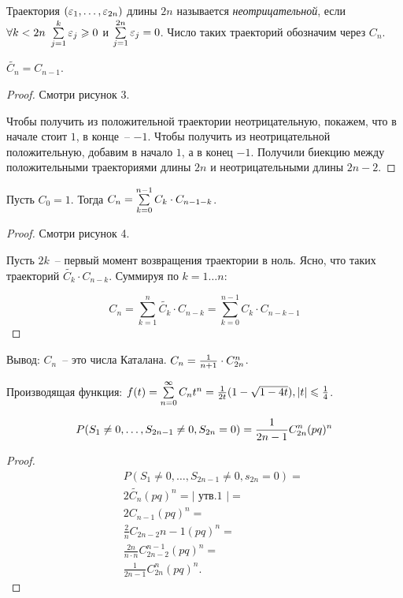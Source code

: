 \begin{definition}
Траектория $(\varepsilon_1, \dots, \varepsilon_{2n})$ длины $2n$ называется
\emph{неотрицательной}, если
$\forall k < 2n~\sum\limits_{j=1}^k \varepsilon_j \geqslant 0$ и $\sum\limits_{j=1}^{2n} \varepsilon_j = 0$.
Число таких траекторий обозначим через $C_n$.
\end{definition}

\begin{statement}
$\tilde{C_n} = C_{n-1}$.
\end{statement}
\begin{proof}
Смотри рисунок 3.

Чтобы получить из положительной траектории неотрицательную, покажем,
что в начале стоит $1$, в конце~-- $-1$. Чтобы получить из неотрицательной положительную,
добавим в начало $1$, а в конец $-1$. Получили биекцию между положительными траекториями длины $2n$
и неотрицательными длины $2n-2$.
\end{proof}

\begin{statement}
Пусть $C_0 = 1$. Тогда $C_n = \sum\limits_{k=0}^{n-1} C_k \cdot C_{n-1-k}$.
\end{statement}
\begin{proof}
Смотри рисунок 4.

Пусть $2k$~-- первый момент возвращения траектории в ноль.
Ясно, что таких траекторий $\tilde{C_k} \cdot C_{n-k}$. Суммируя по $k=1\dots n$:

$$C_n = \sum_{k=1}^n \tilde{C_k} \cdot C_{n-k} = \sum_{k=0}^{n-1} C_k \cdot C_{n-k-1}$$
\end{proof}

Вывод: $C_n$~-- это числа Каталана. $C_n =\frac{1}{n+1} \cdot C_{2n}^{n}$.

Производящая функция: $f(t) = \sum\limits_{n=0}^{\infty} C_n t^n = \frac{1}{2t}(1-\sqrt{1-4t}), |t| \leqslant \frac14$.

\begin{theorem}
$$P(S_1 \neq 0, \dots, S_{2n-1} \neq 0, S_{2n} = 0) = \frac{1}{2n-1}C_{2n}^{n}(pq)^n$$
\end{theorem}
\begin{proof}
\begin{eqnarray*}
&&P(S_1 \neq 0, \dots, S_{2n-1} \neq 0 , s_{2n} = 0) = \\
&&2\tilde{C_n} (pq)^n = \text{| утв.1 |} = \\
&&2 C_{n-1} (pq)^n = \\
&&\frac2n C_{2n-2}{n-1} (pq)^n = \\
&&\frac{2n}{n\cdot n} C_{2n-2}^{n-1}(pq)^n = \\
&&\frac{1}{2n-1}C_{2n}^{n}(pq)^n.
\end{eqnarray*}
\end{proof}

